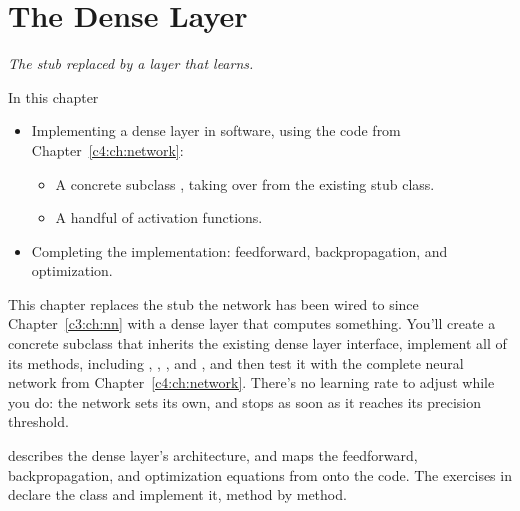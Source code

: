
\chapter{The Dense Layer}
\label{c5:ch:dense}

{\large\itshape The stub replaced by a layer that learns.\par}

\begin{chapterbox}{In this chapter}
\begin{itemize}
  \item Implementing a dense layer in software, using the code from Chapter~\ref{c4:ch:network}:
  \begin{itemize}
    \item A concrete subclass , taking over from the existing stub class.
    \item A handful of activation functions.
  \end{itemize}
  \item Completing the implementation: feedforward, backpropagation, and optimization.
\end{itemize}
\end{chapterbox}

This chapter replaces the stub the network has been wired to since Chapter~\ref{c3:ch:nn} with a
dense layer that computes something. You'll create a concrete subclass that inherits the existing
dense layer interface, implement all of its methods, including ,
, , and , and then test it with the
complete neural network from Chapter~\ref{c4:ch:network}. There's no learning rate to adjust while
you do: the network sets its own, and stops as soon as it reaches its precision threshold.

 describes the dense layer's architecture, and  maps
the feedforward, backpropagation, and optimization equations from  onto the code.
The exercises in  declare the class and implement it, method by method.




